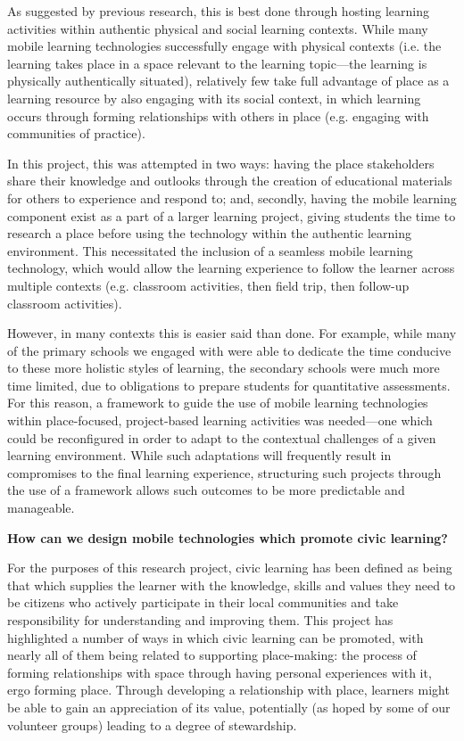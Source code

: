 As suggested by previous research, this is best done through hosting learning activities within authentic physical and social learning contexts. While many mobile learning technologies successfully engage with physical contexts (i.e. the learning takes place in a space relevant to the learning topic---the learning is physically authentically situated), relatively few take full advantage of place as a learning resource by also engaging with its social context, in which learning occurs through forming relationships with others in place (e.g. engaging with communities of practice). 

In this project, this was attempted in two ways: having the place stakeholders share their knowledge and outlooks through the creation of educational materials for others to experience and respond to; and, secondly, having the mobile learning component exist as a part of a larger learning project, giving students the time to research a place before using the technology within the authentic learning environment. This necessitated the inclusion of a seamless mobile learning technology, which would allow the learning experience to follow the learner across multiple contexts (e.g. classroom activities, then field trip, then follow-up classroom activities). 

However, in many contexts this is easier said than done. For example, while many of the primary schools we engaged with were able to dedicate the time conducive to these more holistic styles of learning, the secondary schools were much more time limited, due to obligations to prepare students for quantitative assessments. For this reason, a framework to guide the use of mobile learning technologies within place-focused, project-based learning activities was needed---one which could be reconfigured in order to adapt to the contextual challenges of a given learning environment. While such adaptations will frequently result in compromises to the final learning experience, structuring such projects through the use of a framework allows such outcomes to be more predictable and manageable. 

\begin{displayquote}
\textbf{How can we design mobile technologies which promote civic learning?}
\end{displayquote}

For the purposes of this research project, civic learning has been defined as being that which supplies the learner with the knowledge, skills and values they need to be citizens who actively participate in their local communities and take responsibility for understanding and improving them. This project has highlighted a number of ways in which civic learning can be promoted, with nearly all of them being related to supporting place-making: the process of forming relationships with space through having personal experiences with it, ergo forming place. Through developing a relationship with place, learners might be able to gain an appreciation of its value, potentially (as hoped by some of our volunteer groups) leading to a degree of stewardship.

